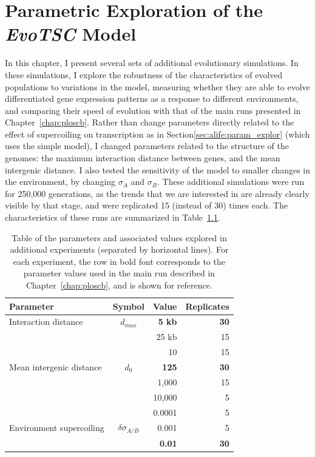 \chapter{Parametric Exploration of the \emph{EvoTSC} Model}
\label{chap:param}

In this chapter, I present several sets of additional evolutionary simulations.
In these simulations, I explore the robustness of the characteristics of evolved populations to variations in the model, measuring whether they are able to evolve differentiated gene expression patterns as a response to different environments, and comparing their speed of evolution with that of the main runs presented in Chapter~\ref{chap:ploscb}.
Rather than change parameters directly related to the effect of supercoiling on transcription as in Section\ref{sec:alife:param_explor} (which uses the simple model), I changed parameters related to the structure of the genomes: the maximum interaction distance between genes, and the mean intergenic distance.
I also tested the sensitivity of the model to smaller changes in the environment, by changing $\sigma_A$ and $\sigma_B$.
These additional simulations were run for 250,000 generations, as the trends that we are interested in are already clearly visible by that stage, and were replicated 15 (instead of 30) times each.
The characteristics of these runs are summarized in Table~\ref{tab:param:params}.


\begin{table}[H]
\begin{center}
\begin{tabular}{l c r r}
\toprule
\textbf{Parameter} & \textbf{Symbol} & \textbf{Value} & \textbf{Replicates} \\
\midrule
Interaction distance & $d_{max}$ & \textbf{5 kb} & \textbf{30}\\
& & 25 kb & 15\\
\midrule
& & 10 & 15\\
Mean intergenic distance & $d_0$ & \textbf{125} & \textbf{30} \\
& & 1,000 & 15\\
& & 10,000 & 5 \\
\midrule
& & 0.0001 & 5\\
Environment supercoiling & $\delta\sigma_{A/B}$ & 0.001 & 5\\
& & \textbf{0.01} & \textbf{30}\\
\bottomrule
\end{tabular}
\end{center}
\caption[Table of parameter values explored in additional \emph{EvoTSC} simulations]{Table of the parameters and associated values explored in additional experiments (separated by horizontal lines).
For each experiment, the row in bold font corresponds to the parameter values used in the main run described in Chapter~\ref{chap:ploscb}, and is shown for reference.}
\label{tab:param:params}
\end{table}

